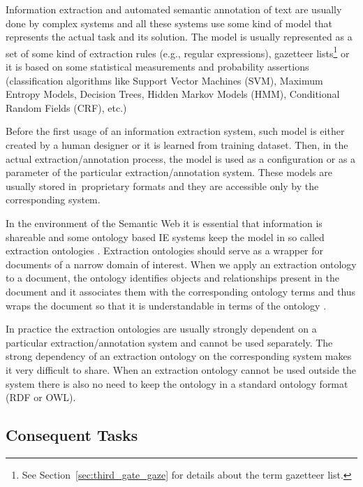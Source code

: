 Information extraction and automated semantic annotation of text are usually done by complex systems and all these systems use some kind of model that represents the actual task and its solution. The model is usually represented as a set of some kind of extraction rules (e.g., regular expressions), gazetteer lists\footnote{See Section~\ref{sec:third_gate_gaze} for details about the term gazetteer list.} or it is based on some statistical measurements and probability assertions (classification algorithms like Support Vector Machines (SVM), Maximum Entropy Models, Decision Trees, Hidden Markov Models (HMM), Conditional Random Fields (CRF), etc.)



Before the first usage of an information extraction system, such model is either created by a human designer or it is learned from training dataset. Then, in the actual extraction/annotation process, the model is used as a configuration or as a parameter of the particular extraction/annotation system. These models are usually stored in~proprietary formats and they are accessible only by the corresponding system.



In the environment of the Semantic Web it is essential that information is shareable and some ontology based IE systems keep the model in so called extraction ontologies \cite{DBLP:conf/er/EmbleyTL02}. Extraction ontologies should serve as a wrapper for documents of a narrow domain of interest. When we apply an extraction ontology to a document, the ontology identifies objects and relationships present in the document and it associates them with the corresponding ontology terms and thus wraps the document so that it is understandable in terms of the ontology \cite{DBLP:conf/er/EmbleyTL02}.



In practice the extraction ontologies are usually strongly dependent on a particular extraction/annotation system and cannot be used separately. The strong dependency of an extraction ontology on the corresponding system makes it very difficult to share. When an extraction ontology cannot be used outside the system there is also no need to keep the ontology in a standard ontology format (RDF or OWL).



\subsection{Consequent Tasks}

